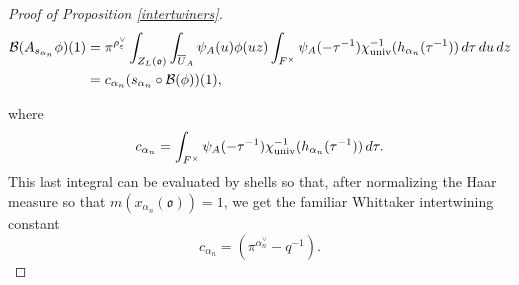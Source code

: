 \documentclass[11pt,letterpaper]{article}
\newcommand{\F}{\mathbb{F}}
\newcommand{\calB}{\mathcal{B}}
\newcommand{\ve}{\varepsilon}
\newcommand{\goth}{\mathfrak}
\theoremstyle{remark}
\numberwithin{equation}{section}
\begin{document}
\begin{proof}[Proof of Proposition \ref{intertwiners}]
\begin{align*}
\calB(A_{s_{\alpha_n}}\phi)(1) &= \pi^{\rho_{\ve}^{\vee}} \int_{Z_L(\goth{o})} \int_{\overline{U}_A} \psi_A(u)\phi(uz) \int_{F^{\times}}\psi_A(-\tau^{-1})\chi_{\textup{univ}}^{-1}(h_{\alpha_n}(\tau^{-1}))\,d\tau\,du\,dz
\\&= c_{\alpha_n}(s_{\alpha_n}\circ \calB(\phi))(1),
\end{align*}



where $$c_{\alpha_n} = \int_{F^{\times}}\psi_A(-\tau^{-1})\chi_{\textup{univ}}^{-1}(h_{\alpha_n}(\tau^{-1}))\,d\tau.$$ This last integral can be evaluated by shells so that, after normalizing the Haar measure so that $m(x_{\alpha_n}(\goth{o}))=1$, we get the familiar Whittaker intertwining constant $$c_{\alpha_n} = (\pi^{\alpha_n^{\vee}}-q^{-1}).$$



\end{proof}
\end{document}
